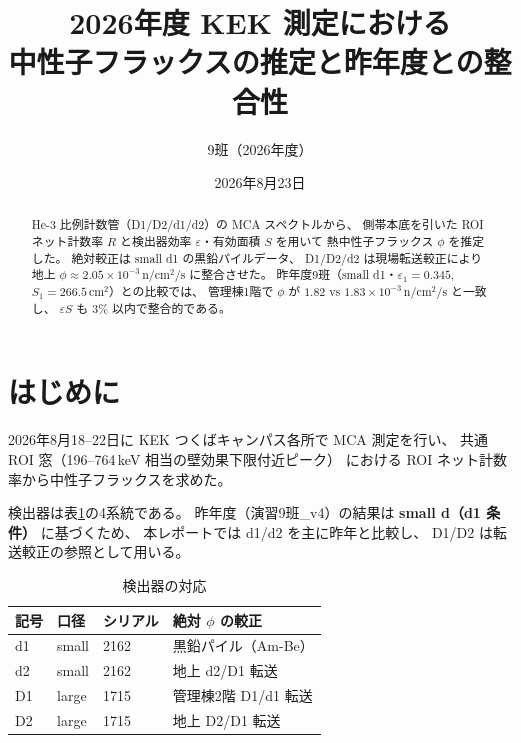 \documentclass[a4paper,11pt]{ltjsarticle}
\title{2026年度 KEK 測定における\\中性子フラックスの推定と昨年度との整合性}
\author{9班（2026年度）}
\date{2026年8月23日}
\begin{document}
\maketitle

\begin{abstract}
He-3 比例計数管（D1/D2/d1/d2）の MCA スペクトルから、
側帯本底を引いた ROI ネット計数率 $R$ と検出器効率 $\varepsilon$・有効面積 $S$ を用いて
熱中性子フラックス $\phi$ を推定した。
絶対較正は small d1 の黒鉛パイルデータ、
D1/D2/d2 は現場転送較正により地上 $\phi \approx 2.05\times10^{-3}\,\mathrm{n/cm^2/s}$ に整合させた。
昨年度9班（small d1・$\varepsilon_1=0.345$, $S_1=266.5\,\mathrm{cm^2}$）との比較では、
管理棟1階で $\phi$ が $1.82$ vs $1.83\times10^{-3}\,\mathrm{n/cm^2/s}$ と一致し、
$\varepsilon S$ も 3\% 以内で整合的である。
\end{abstract}

\tableofcontents
\newpage

\section{はじめに}

2026年8月18--22日に KEK つくばキャンパス各所で MCA 測定を行い、
共通 ROI 窓（196--764\,keV 相当の壁効果下限付近ピーク）
における ROI ネット計数率から中性子フラックスを求めた。

検出器は表\ref{tab:detectors}の4系統である。
昨年度（演習9班\_v4）の結果は \textbf{small d（d1 条件）} に基づくため、
本レポートでは d1/d2 を主に昨年と比較し、
D1/D2 は転送較正の参照として用いる。

\begin{table}[htbp]
  \centering
  \caption{検出器の対応}
  \label{tab:detectors}
  \begin{tabular}{llll}
    \toprule
    記号 & 口径 & シリアル & 絶対 $\phi$ の較正 \\
    \midrule
    d1 & small & 2162 & 黒鉛パイル（Am-Be） \\
    d2 & small & 2162 & 地上 d2/D1 転送 \\
    D1 & large  & 1715 & 管理棟2階 D1/d1 転送 \\
    D2 & large  & 1715 & 地上 D2/D1 転送 \\
    \bottomrule
    \end{tabular}
\end{table}
\end{document}
